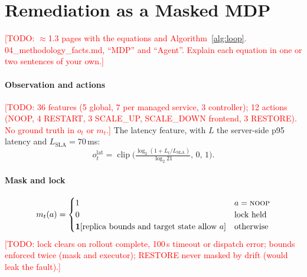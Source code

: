 \documentclass[conference,10pt]{IEEEtran}
\newcommand{\todo}[1]{\textcolor{red}{[TODO: #1]}}
\DeclareMathOperator*{\clip}{clip}
\begin{document}
\section{Remediation as a Masked MDP}\label{sec:method}
\todo{$\approx$1.3 pages with the equations and Algorithm~\ref{alg:loop}. 04\_methodology\_facts.md, ``MDP'' and ``Agent''. Explain each equation in one or two sentences of your own.}

\paragraph*{Observation and actions}
\todo{36 features (5 global, 7 per managed service, 3 controller); 12 actions (NOOP, 4 RESTART, 3 SCALE\_UP, SCALE\_DOWN frontend, 3 RESTORE). No ground truth in $o_t$ or $m_t$.}
The latency feature, with $L$ the server-side p95 latency and $L_{\mathrm{SLA}}=70$\,ms:
\begin{equation}
o_t^{\mathrm{lat}} = \clip\!\Big(\tfrac{\log_2(1+L_t/L_{\mathrm{SLA}})}{\log_2 21},\,0,\,1\Big).
\end{equation}

\paragraph*{Mask and lock}
\begin{equation}
m_t(a)=\begin{cases}
1 & a=\textsc{noop}\\
0 & \text{lock held}\\
\mathbf{1}[\text{replica bounds and target state allow }a] & \text{otherwise}
\end{cases}
\end{equation}
\todo{lock clears on rollout complete, 100\,s timeout or dispatch error; bounds enforced twice (mask and executor); RESTORE never masked by drift (would leak the fault).}
\end{document}
